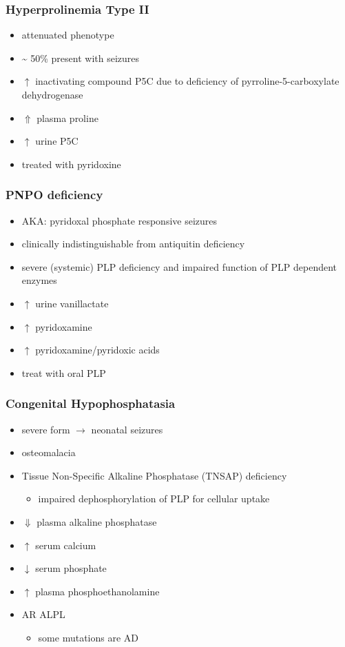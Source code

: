 \documentclass{scrartcl}
\begin{document}
\subsubsection{Hyperprolinemia Type II}
\label{sec:org153d115}
\begin{itemize}
\item attenuated phenotype
\item \textasciitilde{} 50\% present with seizures
\item \(\uparrow\) inactivating compound P5C due to deficiency of pyrroline-5-carboxylate dehydrogenase
\item \(\Uparrow\) plasma proline
\item \(\uparrow\) urine P5C
\item treated with pyridoxine
\end{itemize}

\subsubsection{PNPO deficiency}
\label{sec:orgce26672}
\begin{itemize}
\item AKA: pyridoxal phosphate responsive seizures
\item clinically indistinguishable from antiquitin deficiency
\item severe (systemic) PLP deficiency and impaired function of PLP
dependent enzymes
\item \(\uparrow\) urine vanillactate
\item \(\uparrow\) pyridoxamine
\item \(\uparrow\) pyridoxamine/pyridoxic acids
\item treat with oral PLP
\end{itemize}

\subsubsection{Congenital Hypophosphatasia}
\label{sec:org5307b8f}
\begin{itemize}
\item severe form \(\to\) neonatal seizures
\item osteomalacia
\item Tissue Non-Specific Alkaline Phosphatase (TNSAP) deficiency
\begin{itemize}
\item impaired dephosphorylation of PLP for cellular uptake
\end{itemize}
\item \(\Downarrow\) plasma alkaline phosphatase
\item \(\uparrow\) serum calcium
\item \(\downarrow\) serum phosphate
\item \(\uparrow\) plasma phosphoethanolamine
\item AR ALPL
\begin{itemize}
\item some mutations are AD
\end{itemize}
\end{itemize}
\end{document}
